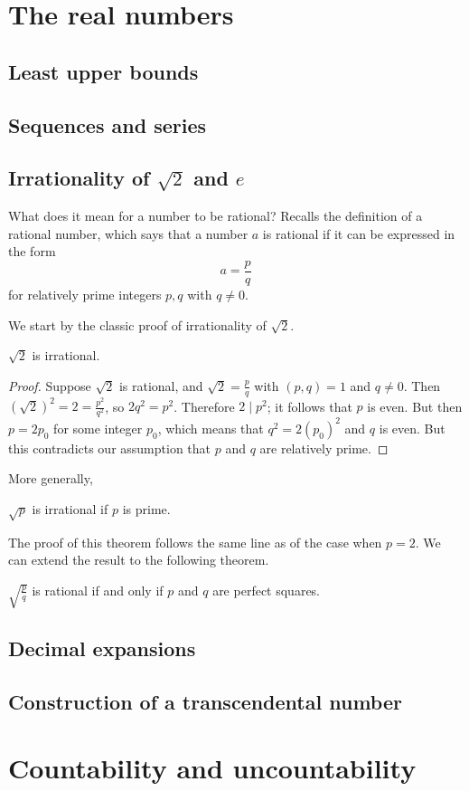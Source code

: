 \documentclass[main.tex]{subfiles}
\begin{document}
	\section{The real numbers}
		\subsection{Least upper bounds}
		
		\subsection{Sequences and series}
		
		\subsection{Irrationality of $\sqrt{2}$ and $e$}
		What does it mean for a number to be rational? Recalls the definition of a rational number, which says that a number $a$ is rational if it can be expressed in the form
		\begin{equation*}
			a = \frac{p}{q}
		\end{equation*}
		for relatively prime integers $p, q$ with $q \neq 0$.
		
		We start by the classic proof of irrationality of $\sqrt{2}$.
		\begin{theorem}
			$\sqrt{2}$ is irrational.
		\end{theorem}
		\begin{proof}
			Suppose $\sqrt{2}$ is rational, and $\sqrt{2} = \frac{p}{q}$ with $(p, q) = 1$ and $q \neq 0$. Then $(\sqrt{2})^2 = 2 = \frac{p^2}{q^2}$, so $2q^2 = p^2$. Therefore $2 \mid p^2$; it follows that $p$ is even. But then $p = 2p_0$ for some integer $p_0$, which means that $q^2 = 2{(p_0)}^2$ and $q$ is even. But this contradicts our assumption that $p$ and $q$ are relatively prime.
		\end{proof}
	
		More generally,
		\begin{theorem}
			$\sqrt{p}$ is irrational if $p$ is prime.
		\end{theorem}
		The proof of this theorem follows the same line as of the case when $p = 2$. We can extend the result to the following theorem.
		\begin{theorem}
			$\sqrt{\frac{p}{q}}$ is rational if and only if $p$ and $q$ are perfect squares.
		\end{theorem}
		
		\subsection{Decimal expansions}
		
		\subsection{Construction of a transcendental number}
	\section{Countability and uncountability}
		
	
\end{document}
